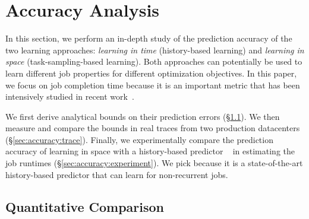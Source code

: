 \section{Accuracy Analysis}
\label{sec:accuracy}


In this section, we perform an in-depth study of the prediction
accuracy of the two learning approaches: {\em learning in time}
(history-based learning) and {\em learning in space}
(task-sampling-based learning).  
{
Both approaches can potentially be used
to learn  different job properties for different optimization objectives.
In this paper, we focus on job completion time 
because it is an important metric that has been intensively studied
in recent work~\cite{cora:infocom2015,DontCryOverSpilledRecords,kairos:socc2018,varys:sigcomm14,corral,3Sigma,AltruisticScheduling,aalo:sigcomm15}.
}


We first derive analytical bounds on
their prediction errors (\S\ref{sec:accuracy:quantity}).  We then
measure and compare the bounds in real traces from two production
datacenters (\S\ref{sec:accuracy:trace}).  Finally, we
experimentally compare the prediction accuracy of learning in space
with a history-based predictor
\primarybasepredict~\cite{3Sigma} in estimating the job runtimes
(\S\ref{sec:accuracy:experiment}).
We pick \primarybasepredict because it is a state-of-the-art 
history-based predictor that can learn for non-recurrent jobs.


\subsection{Quantitative Comparison}
\label{sec:accuracy:quantity}

